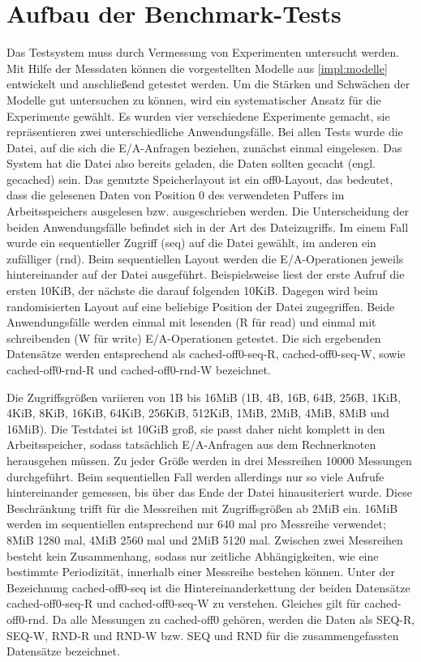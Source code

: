 \documentclass[
	12pt,
	a4paper,
	BCOR10mm,
	DIV14,
	listof=totoc,
	bibliography=totoc,
	headsepline
]{scrreprt}
\begin{document}
\section{Aufbau der Benchmark-Tests}
\label{benchmark}
Das Testsystem muss durch Vermessung von Experimenten untersucht werden.
Mit Hilfe der Messdaten können die vorgestellten Modelle aus \ref{impl:modelle} entwickelt und anschließend getestet werden.
Um die Stärken und Schwächen der Modelle gut untersuchen zu können, wird ein systematischer Ansatz für die Experimente gewählt. Es wurden vier verschiedene Experimente gemacht, sie repräsentieren zwei unterschiedliche Anwendungsfälle.
Bei allen Tests wurde die Datei, auf die sich die E/A-Anfragen beziehen, zunächst einmal eingelesen. Das System hat die Datei also bereits geladen, die Daten sollten gecacht (engl. gecached) sein. 
Das genutzte Speicherlayout ist ein off0-Layout, das bedeutet, dass die gelesenen Daten von Position 0 des verwendeten Puffers im Arbeitsspeichers ausgelesen bzw. ausgeschrieben werden.
Die Unterscheidung der beiden Anwendungsfälle befindet sich in der Art des Dateizugriffs.
Im einem Fall wurde ein sequentieller Zugriff (seq) auf die Datei gewählt, im anderen ein zufälliger (rnd).
Beim sequentiellen Layout werden die E/A-Operationen jeweils hintereinander auf der Datei ausgeführt. Beispielsweise liest der erste Aufruf die ersten 10KiB, der nächste die darauf folgenden 10KiB.
Dagegen wird beim randomisierten Layout auf eine beliebige Position der Datei zugegriffen.
Beide Anwendungsfälle werden einmal mit lesenden (R für read) und einmal mit schreibenden (W für write) E/A-Operationen getestet.
Die sich ergebenden Datensätze werden entsprechend als cached-off0-seq-R, cached-off0-seq-W, sowie cached-off0-rnd-R und cached-off0-rnd-W bezeichnet.

Die Zugriffsgrößen variieren von 1B bis 16MiB (1B, 4B, 16B, 64B, 256B, 1KiB, 4KiB, 8KiB, 16KiB, 64KiB, 256KiB, 512KiB, 1MiB, 2MiB, 4MiB, 8MiB und 16MiB).
Die Testdatei ist 10GiB groß, sie passt daher nicht komplett in den Arbeitsspeicher, sodass tatsächlich E/A-Anfragen aus dem Rechnerknoten herausgehen müssen.
Zu jeder Größe werden in drei Messreihen 10000 Messungen durchgeführt.
Beim sequentiellen Fall werden allerdings nur so viele Aufrufe hintereinander gemessen, bis über das Ende der Datei hinausiteriert wurde. Diese Beschränkung trifft für die Messreihen mit Zugriffsgrößen ab 2MiB ein. 16MiB werden im sequentiellen entsprechend nur 640 mal pro Messreihe verwendet; 8MiB 1280 mal, 4MiB 2560 mal und 2MiB 5120 mal.
Zwischen zwei Messreihen besteht kein Zusammenhang, sodass nur zeitliche Abhängigkeiten, wie eine bestimmte Periodizität, innerhalb einer Messreihe bestehen können.  
Unter der Bezeichnung cached-off0-seq ist die Hintereinanderkettung der beiden Datensätze cached-off0-seq-R und cached-off0-seq-W zu verstehen. Gleiches gilt für cached-off0-rnd.
Da alle Messungen zu cached-off0 gehören, werden die Daten als SEQ-R, SEQ-W, RND-R und RND-W bzw. SEQ und RND für die zusammengefassten Datensätze bezeichnet. 
\end{document}
